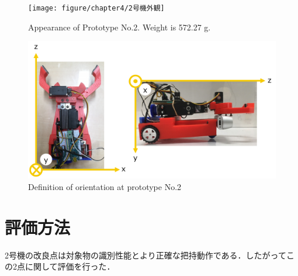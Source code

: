 \begin{figure}[H]
    \centering
    \begin{minipage}{\linewidth}
        \centering
        \texttt{[image: figure/chapter4/2号機外観]}
        \caption{Appearance of Prototype No.2. Weight is 572.27 g.}
        \label{fig:2号機外観}
    \end{minipage}
    \begin{minipage}{\linewidth}
        \centering
        \includegraphics[width=0.9\linewidth]{figure/chapter4/2号機向き}
        \caption{Definition of orientation at prototype No.2}
        \label{fig:2号機向き}
    \end{minipage}
\end{figure}


\section{評価方法}
2号機の改良点は対象物の識別性能とより正確な把持動作である．したがってこの2点に関して評価を行った．

